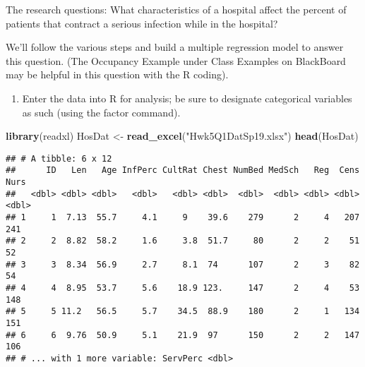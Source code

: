 \documentclass[]{article}
\newenvironment{Shaded}{\begin{snugshade}}{\end{snugshade}}
\newcommand{\KeywordTok}[1]{\textcolor[rgb]{0.13,0.29,0.53}{\textbf{#1}}}
\newcommand{\DataTypeTok}[1]{\textcolor[rgb]{0.13,0.29,0.53}{#1}}
\newcommand{\StringTok}[1]{\textcolor[rgb]{0.31,0.60,0.02}{#1}}
\newcommand{\OperatorTok}[1]{\textcolor[rgb]{0.81,0.36,0.00}{\textbf{#1}}}
\newcommand{\NormalTok}[1]{#1}
\providecommand{\tightlist}{%
  \setlength{\itemsep}{0pt}\setlength{\parskip}{0pt}}
\begin{document}
The research questions: What characteristics of a hospital affect the
percent of patients that contract a serious infection while in the
hospital?

We'll follow the various steps and build a multiple regression model to
answer this question. (The Occupancy Example under Class Examples on
BlackBoard may be helpful in this question with the R coding).

\begin{enumerate}
\def\labelenumi{\Alph{enumi})}
\tightlist
\item
  Enter the data into R for analysis; be sure to designate categorical
  variables as such (using the factor command).
\end{enumerate}

\begin{Shaded}
\begin{Highlighting}[]
\KeywordTok{library}\NormalTok{(readxl)}
\NormalTok{HosDat <-}\StringTok{ }\KeywordTok{read_excel}\NormalTok{(}\StringTok{"Hwk5Q1DatSp19.xlsx"}\NormalTok{)}
\KeywordTok{head}\NormalTok{(HosDat)}
\end{Highlighting}
\end{Shaded}

\begin{verbatim}
## # A tibble: 6 x 12
##      ID   Len   Age InfPerc CultRat Chest NumBed MedSch   Reg  Cens  Nurs
##   <dbl> <dbl> <dbl>   <dbl>   <dbl> <dbl>  <dbl>  <dbl> <dbl> <dbl> <dbl>
## 1     1  7.13  55.7     4.1     9    39.6    279      2     4   207   241
## 2     2  8.82  58.2     1.6     3.8  51.7     80      2     2    51    52
## 3     3  8.34  56.9     2.7     8.1  74      107      2     3    82    54
## 4     4  8.95  53.7     5.6    18.9 123.     147      2     4    53   148
## 5     5 11.2   56.5     5.7    34.5  88.9    180      2     1   134   151
## 6     6  9.76  50.9     5.1    21.9  97      150      2     2   147   106
## # ... with 1 more variable: ServPerc <dbl>
\end{verbatim}

\begin{Shaded}
\end{Shaded}
\end{document}
